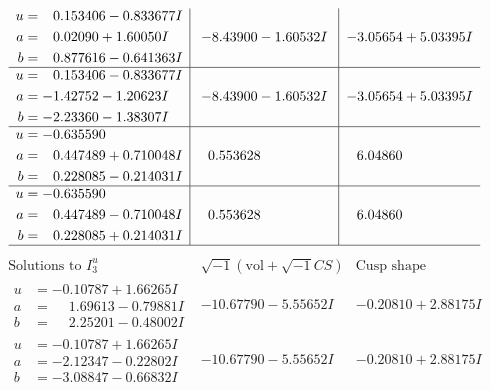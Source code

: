 \documentclass[1p]{elsarticle_modified}
\theoremstyle{definition}
\newcommand{\I}{\sqrt{-1}}
\begin{document}
$$\begin{array}{c|c|c}
\begin{aligned}
u &= \phantom{-}0.153406 - 0.833677 I \\
a &= \phantom{-}0.02090 + 1.60050 I \\
b &= \phantom{-}0.877616 - 0.641363 I\end{aligned}
 & -8.43900 - 1.60532 I & -3.05654 + 5.03395 I \\ \hline\begin{aligned}
u &= \phantom{-}0.153406 - 0.833677 I \\
a &= -1.42752 - 1.20623 I \\
b &= -2.23360 - 1.38307 I\end{aligned}
 & -8.43900 - 1.60532 I & -3.05654 + 5.03395 I \\ \hline\begin{aligned}
u &= -0.635590\phantom{ +0.000000I} \\
a &= \phantom{-}0.447489 + 0.710048 I \\
b &= \phantom{-}0.228085 - 0.214031 I\end{aligned}
 & \phantom{-}0.553628\phantom{ +0.000000I} & \phantom{-}6.04860\phantom{ +0.000000I} \\ \hline\begin{aligned}
u &= -0.635590\phantom{ +0.000000I} \\
a &= \phantom{-}0.447489 - 0.710048 I \\
b &= \phantom{-}0.228085 + 0.214031 I\end{aligned}
 & \phantom{-}0.553628\phantom{ +0.000000I} & \phantom{-}6.04860\phantom{ +0.000000I}\\
 \hline 
 \end{array}$$\newpage$$\begin{array}{c|c|c}  
\text{Solutions to }I^u_{3}& \I (\text{vol} + \sqrt{-1}CS) & \text{Cusp shape}\\
 \hline 
\begin{aligned}
u &= -0.10787 + 1.66265 I \\
a &= \phantom{-}1.69613 - 0.79881 I \\
b &= \phantom{-}2.25201 - 0.48002 I\end{aligned}
 & -10.67790 - 5.55652 I & -0.20810 + 2.88175 I \\ \hline\begin{aligned}
u &= -0.10787 + 1.66265 I \\
a &= -2.12347 - 0.22802 I \\
b &= -3.08847 - 0.66832 I\end{aligned}
 & -10.67790 - 5.55652 I & -0.20810 + 2.88175 I \\ \hline\begin{aligned}

\end{aligned}
\end{array}$$
\end{document}
